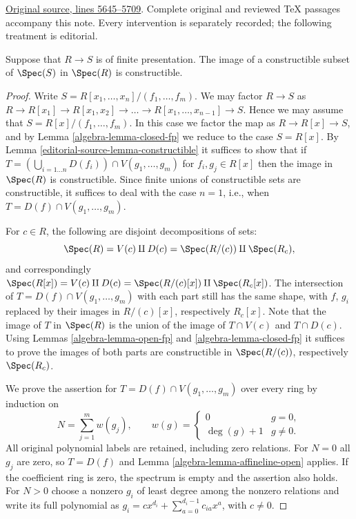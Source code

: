 \hypertarget{algebra-context-038}{}

\noindent\href{https://github.com/stacks/stacks-project/blob/a04446e57ec1fbc252a871afcec7752fb2807b14/algebra.tex\#L5645}{Original source, lines 5645--5709}. Complete original and reviewed TeX passages accompany this note. Every intervention is separately recorded; the following treatment is editorial.


\begin{theorem}
\label{editorial-source-theorem-chevalley}
Suppose that $R \to S$ is of finite presentation.
The image of a constructible subset of
$\Spec(S)$ in $\Spec(R)$ is constructible.
\end{theorem}

\begin{proof}
Write $S = R[x_1, \ldots, x_n]/(f_1, \ldots, f_m)$.
We may factor $R \to S$ as $R \to R[x_1] \to R[x_1, x_2]
\to \ldots \to R[x_1, \ldots, x_{n-1}] \to S$. Hence
we may assume that $S = R[x]/(f_1, \ldots, f_m)$.
In this case we factor the map as $R \to R[x] \to S$,
and by Lemma \ref{algebra-lemma-closed-fp} we reduce to
the case $S = R[x]$. By Lemma \ref{editorial-source-lemma-constructible} it suffices
to show that if
$T = (\bigcup_{i = 1\ldots n} D(f_i)) \cap V(g_1, \ldots, g_m)$
for $f_i , g_j \in R[x]$ then the image in $\Spec(R)$ is
constructible. Since finite unions of constructible sets
are constructible, it suffices to deal with the case $n = 1$,
i.e., when $T = D(f) \cap V(g_1, \ldots, g_m)$.

\medskip\noindent
For $c \in R$, the following are disjoint decompositions of sets:
$$
\Spec(R) =
V(c) \amalg D(c) =
\Spec(R/(c)) \amalg \Spec(R_c),
$$
and correspondingly $\Spec(R[x]) =
V(c) \amalg D(c) = \Spec(R/(c)[x]) \amalg
\Spec(R_c[x])$. The intersection of $T = D(f) \cap V(g_1, \ldots, g_m)$
with each part still has the same shape, with $f$, $g_i$ replaced
by their images in $R/(c)[x]$, respectively $R_c[x]$.
Note that the image of $T$
in $\Spec(R)$ is the union of the image of
$T \cap V(c)$ and $T \cap D(c)$. Using Lemmas \ref{algebra-lemma-open-fp}
and \ref{algebra-lemma-closed-fp} it suffices to prove the images of both
parts are constructible in $\Spec(R/(c))$, respectively
$\Spec(R_c)$.

\medskip\noindent
We prove the assertion for
$T=D(f)\cap V(g_1,\ldots,g_m)$ over every ring by induction on
$$
N=\sum_{j=1}^m w(g_j),\qquad
w(g)=\begin{cases}0&g=0,\\ \deg(g)+1&g\ne0.\end{cases}
$$
All original polynomial labels are retained, including zero relations.
For $N=0$ all $g_j$ are zero, so $T=D(f)$ and
Lemma \ref{algebra-lemma-affineline-open} applies. If the coefficient ring is
zero, the spectrum is empty and the assertion also holds. For $N>0$
choose a nonzero $g_i$ of least degree among the nonzero relations and
write its full polynomial as
$g_i=c x^{d_i}+\sum_{a=0}^{d_i-1}c_{ia}x^a$, with $c\ne0$.


\end{proof}
